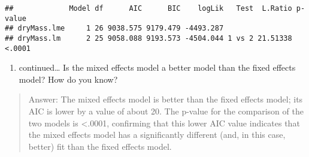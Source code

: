 \documentclass[]{article}
\providecommand{\tightlist}{%
  \setlength{\itemsep}{0pt}\setlength{\parskip}{0pt}}
\begin{document}
\begin{verbatim}
##             Model df      AIC      BIC    logLik   Test  L.Ratio p-value
## dryMass.lme     1 26 9038.575 9179.479 -4493.287                        
## dryMass.lm      2 25 9058.088 9193.573 -4504.044 1 vs 2 21.51338  <.0001
\end{verbatim}

\begin{enumerate}
\def\labelenumi{\alph{enumi}.}
\setcounter{enumi}{3}
\tightlist
\item
  continued\ldots{} Is the mixed effects model a better model than the
  fixed effects model? How do you know?
\end{enumerate}

\begin{quote}
Answer: The mixed effects model is better than the fixed effects model;
its AIC is lower by a value of about 20. The p-value for the comparison
of the two models is \textless{}.0001, confirming that this lower AIC
value indicates that the mixed effects model has a significantly
different (and, in this case, better) fit than the fixed effects model.
\end{quote}
\end{document}
